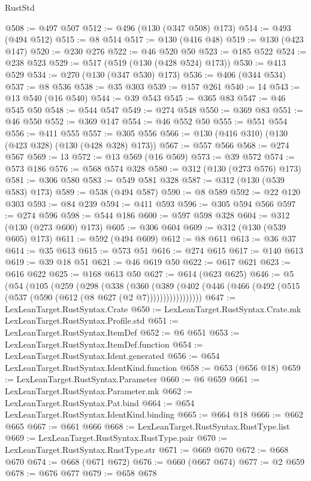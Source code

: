 \begin{lexlean}{RustStd}
\begin{coremodule}
@508 := @497 @507
@512 := @496 (@130 (@347 @508) @173)
@514 := @493 (@494 @512)
@515 := @8 @514
@517 := @130 (@416 @48)
@519 := @130 (@423 @147)
@520 := @230 @276
@522 := @46 @520 @50
@523 := @185 @522
@524 := @238 @523
@529 := @517 (@519 (@130 (@428 @524) @173))
@530 := @413 @529
@534 := @270 (@130 (@347 @530) @173)
@536 := @406 (@344 @534)
@537 := @8 @536
@538 := @35 @303
@539 := @157 @261
@540 := 14
@543 := @13 @540 (@16 @540)
@544 := @39 @543
@545 := @365 @83
@547 := @46 @545 @50
@548 := @544 @547
@549 := @274 @548
@550 := @369 @83
@551 := @46 @550
@552 := @369 @147
@554 := @46 @552 @50
@555 := @551 @554
@556 := @411 @555
@557 := @305 @556
@566 := @130 (@416 @310) (@130 (@423 @328) (@130 (@428 @328) @173))
@567 := @557 @566
@568 := @274 @567
@569 := 13
@572 := @13 @569 (@16 @569)
@573 := @39 @572
@574 := @573 @186
@576 := @568 @574 @328
@580 := @312 (@130 (@273 @576) @173)
@581 := @306 @580
@583 := @549 @581 @328
@587 := @312 (@130 (@539 @583) @173)
@589 := @538 (@494 @587)
@590 := @8 @589
@592 := @22 @120 @303
@593 := @84 @239
@594 := @411 @593
@596 := @305 @594 @566
@597 := @274 @596
@598 := @544 @186
@600 := @597 @598 @328
@604 := @312 (@130 (@273 @600) @173)
@605 := @306 @604
@609 := @312 (@130 (@539 @605) @173)
@611 := @592 (@494 @609)
@612 := @8 @611
@613 := @36 @37
@614 := @35 @613
@615 := @573 @51
@616 := @274 @615
@617 := @140 @613
@619 := @39 @18 @51
@621 := @46 @619 @50
@622 := @617 @621
@623 := @616 @622
@625 := @168 @613 @50
@627 := @614 (@623 @625)
@646 := @5
    (@54
      (@105
        (@259
          (@298
            (@338
              (@360
                (@389
                  (@402 (@446 (@466 (@492 (@515 (@537 (@590 (@612 (@8 @627 (@2 @7)))))))))))))))))
@647 := LexLeanTarget.RustSyntax.Crate
@650 := LexLeanTarget.RustSyntax.Crate.mk LexLeanTarget.RustSyntax.Profile.std
@651 := LexLeanTarget.RustSyntax.ItemDef
@652 := @6 @651
@653 := LexLeanTarget.RustSyntax.ItemDef.function
@654 := LexLeanTarget.RustSyntax.Ident.generated
@656 := @654 LexLeanTarget.RustSyntax.IdentKind.function
@658 := @653 (@656 @18)
@659 := LexLeanTarget.RustSyntax.Parameter
@660 := @6 @659
@661 := LexLeanTarget.RustSyntax.Parameter.mk
@662 := LexLeanTarget.RustSyntax.Pat.bind
@664 := @654 LexLeanTarget.RustSyntax.IdentKind.binding
@665 := @664 @18
@666 := @662 @665
@667 := @661 @666
@668 := LexLeanTarget.RustSyntax.RustType.list
@669 := LexLeanTarget.RustSyntax.RustType.pair
@670 := LexLeanTarget.RustSyntax.RustType.str
@671 := @669 @670
@672 := @668 @670
@674 := @668 (@671 @672)
@676 := @660 (@667 @674)
@677 := @2 @659
@678 := @676 @677
@679 := @658 @678

\end{coremodule}
\end{lexlean}
